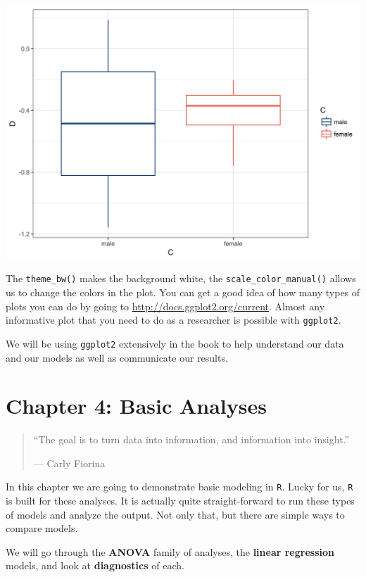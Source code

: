\documentclass[]{tufte-book}
\theoremstyle{definition}
\theoremstyle{definition}
\theoremstyle{remark}
\begin{document}
\includegraphics{_main_files/figure-latex/unnamed-chunk-61-1}

The \texttt{theme\_bw()} makes the background white, the
\texttt{scale\_color\_manual()} allows us to change the colors in the
plot. You can get a good idea of how many types of plots you can do by
going to
\href{http://docs.ggplot2.org/current/}{http://docs.ggplot2.org/current}.
Almost any informative plot that you need to do as a researcher is
possible with \texttt{ggplot2}.

We will be using \texttt{ggplot2} extensively in the book to help
understand our data and our models as well as communicate our results.

\chapter*{Chapter 4: Basic Analyses}\label{chapter-4-basic-analyses}

\begin{quote}
``The goal is to turn data into information, and information into
insight.''

--- Carly Fiorina
\end{quote}

In this chapter we are going to demonstrate basic modeling in
\texttt{R}. Lucky for us, \texttt{R} is built for these analyses. It is
actually quite straight-forward to run these types of models and analyze
the output. Not only that, but there are simple ways to compare models.

We will go through the \textbf{ANOVA} family of analyses, the
\textbf{linear regression} models, and look at \textbf{diagnostics} of
each.
\end{document}
